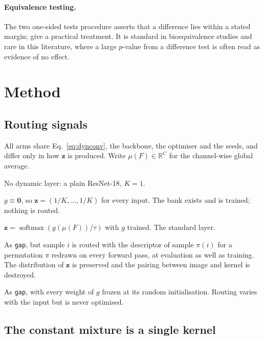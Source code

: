 \documentclass[10pt,a4paper]{article}
\newcommand{\zv}{\mathbf{z}}
\begin{document}
\paragraph{Equivalence testing.} The two one-sided tests procedure
\citep{schuirmann1987} asserts that a difference lies within a stated
margin; \citet{lakens2017} give a practical treatment. It is standard in
bioequivalence studies and rare in this literature, where a large
$p$-value from a difference test is often read as evidence of no effect.

\section{Method}\label{sec:method}

\subsection{Routing signals}

All arms share Eq.~\eqref{eq:dynconv}, the backbone, the optimiser and the
seeds, and differ only in how $\zv$ is produced. Write
$\mu(F)\in\mathbb{R}^{C}$ for the channel-wise global average.

\begin{description}\setlength\itemsep{2pt}
\item[\texttt{static}] No dynamic layer: a plain ResNet-18, $K=1$.
\item[\texttt{uniform}] $g\equiv\mathbf{0}$, so $\zv=(1/K,\dots,1/K)$ for
every input. The bank exists and is trained; nothing is routed.
\item[\texttt{gap}] $\zv=\operatorname{softmax}(g(\mu(F))/\tau)$ with $g$
trained. The standard layer.
\item[\texttt{shuffled}] As \texttt{gap}, but sample $i$ is routed with
the descriptor of sample $\pi(i)$ for a permutation $\pi$ redrawn on every
forward pass, at evaluation as well as training. The distribution of
$\zv$ is preserved and the pairing between image and kernel is
destroyed.
\item[\texttt{frozen\_random}] As \texttt{gap}, with every weight of $g$
frozen at its random initialisation. Routing varies with the input but
is never optimised.
\end{description}

\subsection{The constant mixture is a single kernel}
\end{document}
